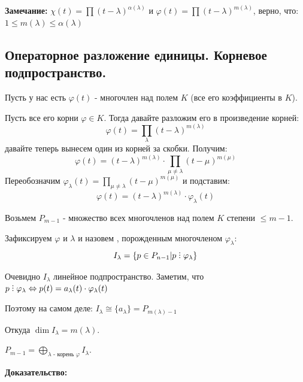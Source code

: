 \textbf{Замечание:}
$\chi(t) = \prod(t-\lambda)^{\alpha(\lambda)}$ и $\varphi(t) = \prod (t-\lambda)^{m(\lambda)}$, верно, что: $1 \leq m(\lambda)\leq \alpha(\lambda)$


\subsection{Операторное разложение единицы. Корневое подпространство.}

Пусть у нас есть $\varphi(t)$ - многочлен над полем $K$ (все его коэффициенты в $K$).

 Пусть все его корни $\varphi \in K$. Тогда давайте разложим его в произведение корней:
$$\varphi(t) = \prod\limits_{\lambda} (t-\lambda)^{m(\lambda)}$$
давайте теперь вынесем один из корней за скобки. Получим:
$$\varphi(t) = (t-\lambda)^{m(\lambda)} \cdot \prod\limits_{\mu\neq \lambda}(t-\mu)^{m(\mu)}$$
Переобозначим $\varphi_{\lambda}(t) = \prod\limits_{\mu\neq \lambda}(t-\mu)^{m(\mu)}$ и подставим:
$$\varphi(t) = (t-\lambda)^{m(\lambda)} \cdot \varphi_{\lambda}(t)$$

Возьмем $P_{m-1}$ - множество всех многочленов над полем $K$ степени $\leq m-1$.

Зафиксируем $\varphi$ и $\lambda$ и назовем  , порожденным многочленом $\varphi_\lambda$:
$$ I_{\lambda} = \{p \in P_{n-1}| p \divby \varphi _{\lambda }\}$$

Очевидно $I_{\lambda}$ линейное подпространство. Заметим, что $p \divby  \varphi_{\lambda} \Leftrightarrow p(t) = a_{\lambda}(t) \cdot \varphi_{\lambda}(t)$ 

 Поэтому на самом деле: $I_{\lambda} \cong \{a_{\lambda}\} = P_{m(\lambda)-1}$

 Откуда $\dim I_{\lambda} = m(\lambda)$.


 $P_{m-1} = \bigoplus\limits_{\lambda\text{ - корень $\varphi$}} I_{\lambda}$.

 \textbf{Доказательство:}

